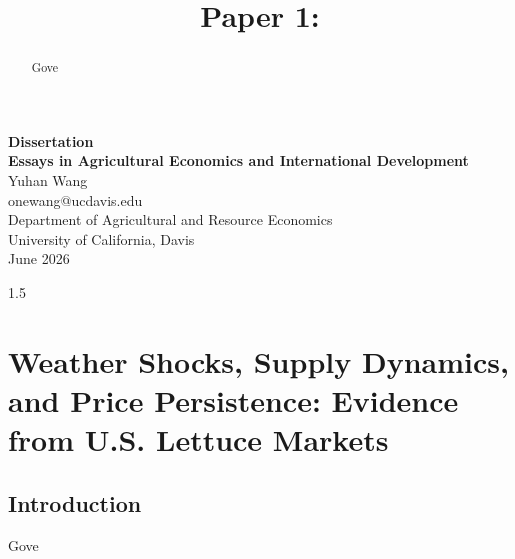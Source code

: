 \documentclass{report}
\title{Paper 1: }
\date{\vspace{-5ex}}
\begin{document}
\begin{titlepage}
\begin{center}
 \vspace{3cm}
 {\LARGE\bfseries Dissertation}\\
 \vspace{2cm}
 {\huge\bfseries Essays in Agricultural Economics and International Development}\\
 \vspace{1.5cm}
 {\large Yuhan Wang}\\[20pt]
 \large onewang@ucdavis.edu\\[14pt]
 \vfill
{\large Department of Agricultural and Resource Economics}\\[5pt]
{\large University of California, Davis}\\[5pt]
 \vfill
{\large June 2026}
\end{center}
\end{titlepage}



\usetikzlibrary{decorations.pathreplacing}
\begin{spacing}{1.5}
    \tableofcontents
\end{spacing}
\clearpage
{}

\chapter{Weather Shocks, Supply Dynamics, and Price Persistence: Evidence from U.S. Lettuce Markets}

\begin{abstract}
\noindent
Gove
\end{abstract}

\section{Introduction}

\noindent
Gove
\end{document}
